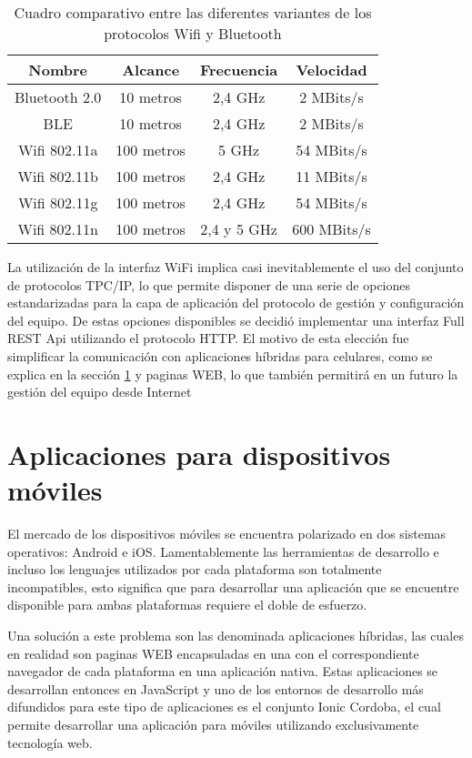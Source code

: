 \begin{table}[ht]
	\centering
	\caption[Comparación entre los protocolos Bluetooth y Wifi]{Cuadro comparativo entre las diferentes variantes de los protocolos Wifi y Bluetooth}
	\begin{tabular}{c c c c}
		\toprule
		\textbf{Nombre}	
		& \textbf{Alcance}
		& \textbf{Frecuencia}
		& \textbf{Velocidad}
		\\
		\midrule
		Bluetooth 2.0
		& 10 metros
		& 2,4 GHz
		& 2 MBits/s
		\\
		BLE
		& 10 metros
		& 2,4 GHz
		& 2 MBits/s
		\\
		Wifi 802.11a
		& 100 metros
		& 5 GHz
		& 54 MBits/s
		\\
		Wifi 802.11b
		& 100 metros
		& 2,4 GHz
		& 11 MBits/s
		\\
		Wifi 802.11g
		& 100 metros
		& 2,4 GHz
		& 54 MBits/s
		\\
		Wifi 802.11n
		& 100 metros
		& 2,4 y 5 GHz
		& 600 MBits/s
		\\
		\bottomrule
		\hline
	\end{tabular}
	\label{tab:WifiBluetooth}
\end{table}

La utilización de la interfaz WiFi implica casi inevitablemente el uso del conjunto de protocolos TPC/IP, lo que permite disponer de una serie de opciones estandarizadas para la capa de aplicación del protocolo de gestión y configuración del equipo. De estas opciones disponibles se decidió implementar una interfaz Full REST Api utilizando el protocolo HTTP. El motivo de esta elección fue simplificar la comunicación con aplicaciones híbridas para celulares, como se explica en la sección \ref{sec:AplicacionesMoviles} y paginas WEB, lo que también permitirá en un futuro la gestión del equipo desde Internet

\section{Aplicaciones para dispositivos móviles}
\label{sec:AplicacionesMoviles}

El mercado de los dispositivos móviles se encuentra polarizado en dos sistemas operativos: Android e iOS. Lamentablemente las herramientas de desarrollo e incluso los lenguajes utilizados por cada plataforma son totalmente incompatibles, esto significa que para desarrollar una aplicación que se encuentre disponible para ambas plataformas requiere el doble de esfuerzo. 

Una solución a este problema son las denominada aplicaciones híbridas, las cuales en realidad son paginas WEB encapsuladas en una con el correspondiente navegador de cada plataforma en una aplicación nativa. Estas aplicaciones se desarrollan entonces en JavaScript y uno de los entornos de desarrollo más difundidos para este tipo de aplicaciones es el conjunto Ionic Cordoba, el cual permite desarrollar una aplicación para móviles utilizando exclusivamente tecnología web. 

